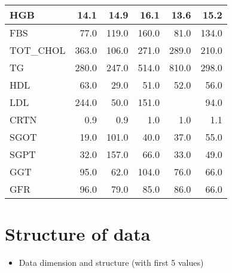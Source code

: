 \documentclass{article}
\providecommand{\tightlist}{%
  \setlength{\itemsep}{0pt}\setlength{\parskip}{0pt}}
\begin{document}
\begin{longtable}{l|r|r|r|r|r}
HGB & 14.1 & 14.9 & 16.1 & 13.6 & 15.2\\
\hline
FBS & 77.0 & 119.0 & 160.0 & 81.0 & 134.0\\
\hline
TOT\_CHOL & 363.0 & 106.0 & 271.0 & 289.0 & 210.0\\
\hline
TG & 280.0 & 247.0 & 514.0 & 810.0 & 298.0\\
\hline
HDL & 63.0 & 29.0 & 51.0 & 52.0 & 56.0\\
\hline
LDL & 244.0 & 50.0 & 151.0 &  & 94.0\\
\hline
CRTN & 0.9 & 0.9 & 1.0 & 1.0 & 1.1\\
\hline
SGOT & 19.0 & 101.0 & 40.0 & 37.0 & 55.0\\
\hline
SGPT & 32.0 & 157.0 & 66.0 & 33.0 & 49.0\\
\hline
GGT & 95.0 & 62.0 & 104.0 & 76.0 & 66.0\\
\hline
GFR & 96.0 & 79.0 & 85.0 & 86.0 & 66.0\\
\hline
\end{longtable}

\newpage

\hypertarget{structure-of-data}{%
\section{Structure of data}\label{structure-of-data}}

\begin{itemize}
\tightlist
\item
  Data dimension and structure (with first 5 values)
\end{itemize}
\end{document}
